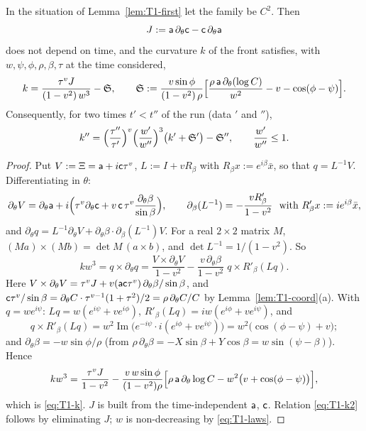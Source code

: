 \begin{lemma}\label{lem:T1-second}
In the situation of Lemma~\ref{lem:T1-first} let the family be $C^2$. Then
\[
J:=\mathsf a\,\partial_\theta\mathsf c-\mathsf c\,\partial_\theta\mathsf a
\]
does not depend on time, and the curvature $k$ of the front satisfies, with $w,\psi,\phi,\rho,\beta,\tau$ at the time considered,
\begin{equation}\label{eq:T1-k}
k=\frac{\tau^vJ}{(1-v^2)\,w^3}-\mathfrak S,\qquad
\mathfrak S:=\frac{v\sin\phi}{(1-v^2)\,\rho}\Bigl[\frac{\rho\,\mathsf a\,\partial_\theta(\log C)}{w^2}-v-\cos(\phi-\psi)\Bigr].
\end{equation}
Consequently, for two times $t'<t''$ of the run (data $'$ and $''$),
\begin{equation}\label{eq:T1-k2}
k''=\Bigl(\frac{\tau''}{\tau'}\Bigr)^v\Bigl(\frac{w'}{w''}\Bigr)^3\bigl(k'+\mathfrak S'\bigr)-\mathfrak S'',\qquad\frac{w'}{w''}\le1 .
\end{equation}
\end{lemma}
\begin{proof}
Put $V:=\Xi=\mathsf a+i\mathsf c\tau^v$, $L:=I+vR_\beta$ with $R_\beta x:=e^{i\beta}\bar x$, so that $q=L^{-1}V$. Differentiating in $\theta$:
\[
\partial_\theta V=\partial_\theta\mathsf a+i\Bigl(\tau^v\partial_\theta\mathsf c+v\,\mathsf c\,\tau^v\frac{\partial_\theta\beta}{\sin\beta}\Bigr),\qquad
\partial_\beta(L^{-1})=-\frac{vR'_\beta}{1-v^2}\ \ \text{with }R'_\beta x:=ie^{i\beta}\bar x,
\]
and $\partial_\theta q=L^{-1}\partial_\theta V+\partial_\theta\beta\cdot\partial_\beta(L^{-1})V$. For a real $2\times2$ matrix $M$,
$(Ma)\times(Mb)=\det M\,(a\times b)$, and $\det L^{-1}=1/(1-v^2)$. So
\[
kw^3=q\times\partial_\theta q=\frac{V\times\partial_\theta V}{1-v^2}-\frac{v\,\partial_\theta\beta}{1-v^2}\;q\times R'_\beta(Lq).
\]
Here $V\times\partial_\theta V=\tau^vJ+v(\mathsf a\mathsf c\tau^v)\,\partial_\theta\beta/\sin\beta$, and
$\mathsf c\tau^v/\sin\beta=\partial_\theta C\cdot\tau^{v-1}(1+\tau^2)/2=\rho\,\partial_\theta C/C$ by Lemma~\ref{lem:T1-coord}(a). With
$q=we^{i\psi}$: $Lq=w(e^{i\psi}+ve^{i\phi})$, $R'_\beta(Lq)=iw(e^{i\phi}+ve^{i\psi})$, and
\[
q\times R'_\beta(Lq)=w^2\operatorname{Im}\bigl(e^{-i\psi}\cdot i(e^{i\phi}+ve^{i\psi})\bigr)=w^2\bigl(\cos(\phi-\psi)+v\bigr);
\]
and $\partial_\theta\beta=-w\sin\phi/\rho$ (from $\rho\,\partial_\theta\beta=-X\sin\beta+Y\cos\beta=w\sin(\psi-\beta)$). Hence
\[
kw^3=\frac{\tau^vJ}{1-v^2}-\frac{v\,w\sin\phi}{(1-v^2)\rho}\Bigl[\rho\,\mathsf a\,\partial_\theta\log C-w^2\bigl(v+\cos(\phi-\psi)\bigr)\Bigr],
\]
which is \eqref{eq:T1-k}. $J$ is built from the time-independent $\mathsf a$, $\mathsf c$. Relation \eqref{eq:T1-k2} follows by eliminating
$J$; $w$ is non-decreasing by \eqref{eq:T1-laws}.
\end{proof}

